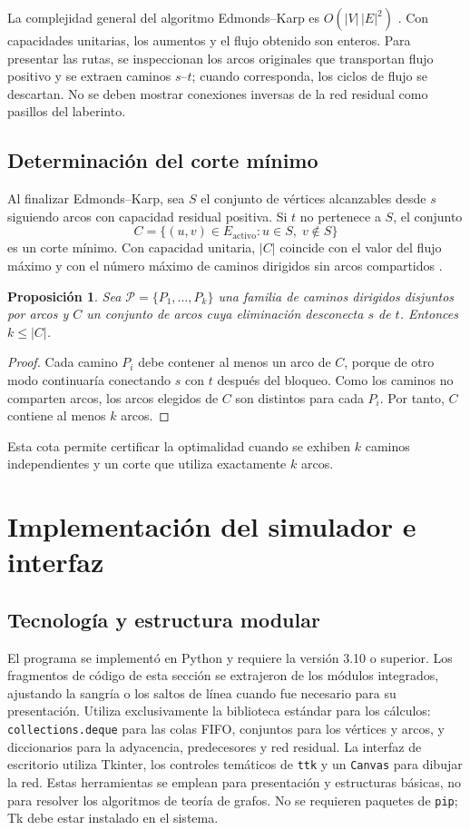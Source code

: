 \documentclass[11pt,a4paper]{article}
\newtheorem{proposition}{Proposición}
\begin{document}
La complejidad general del algoritmo Edmonds--Karp es $O(|V|\,|E|^2)$ \cite{edmonds1972,kleinberg2006}. Con capacidades unitarias, los aumentos y el flujo obtenido son enteros. Para presentar las rutas, se inspeccionan los arcos originales que transportan flujo positivo y se extraen caminos $s$--$t$; cuando corresponda, los ciclos de flujo se descartan. No se deben mostrar conexiones inversas de la red residual como pasillos del laberinto.

\subsection{Determinación del corte mínimo}
Al finalizar Edmonds--Karp, sea $S$ el conjunto de vértices alcanzables desde $s$ siguiendo arcos con capacidad residual positiva. Si $t$ no pertenece a $S$, el conjunto
\begin{equation}\label{eq:cut}
C=\{(u,v)\in E_{\mathrm{activo}}:u\in S,\;v\notin S\}
\end{equation}
es un corte mínimo. Con capacidad unitaria, $|C|$ coincide con el valor del flujo máximo y con el número máximo de caminos dirigidos sin arcos compartidos \cite{ford1956,kleinberg2006}.

\begin{proposition}
Sea $\mathcal{P}=\{P_1,\ldots,P_k\}$ una familia de caminos dirigidos disjuntos por arcos y $C$ un conjunto de arcos cuya eliminación desconecta $s$ de $t$. Entonces $k\leq |C|$.
\end{proposition}
\begin{proof}
Cada camino $P_i$ debe contener al menos un arco de $C$, porque de otro modo continuaría conectando $s$ con $t$ después del bloqueo. Como los caminos no comparten arcos, los arcos elegidos de $C$ son distintos para cada $P_i$. Por tanto, $C$ contiene al menos $k$ arcos.
\end{proof}
Esta cota permite certificar la optimalidad cuando se exhiben $k$ caminos independientes y un corte que utiliza exactamente $k$ arcos.

\section{Implementación del simulador e interfaz}
\subsection{Tecnología y estructura modular}
El programa se implementó en Python y requiere la versión 3.10 o superior. Los fragmentos de código de esta sección se extrajeron de los módulos integrados, ajustando la sangría o los saltos de línea cuando fue necesario para su presentación. Utiliza exclusivamente la biblioteca estándar para los cálculos: \texttt{collections.deque} para las colas FIFO, conjuntos para los vértices y arcos, y diccionarios para la adyacencia, predecesores y red residual. La interfaz de escritorio utiliza Tkinter, los controles temáticos de \texttt{ttk} y un \texttt{Canvas} para dibujar la red. Estas herramientas se emplean para presentación y estructuras básicas, no para resolver los algoritmos de teoría de grafos. No se requieren paquetes de \texttt{pip}; Tk debe estar instalado en el sistema.
\end{document}
